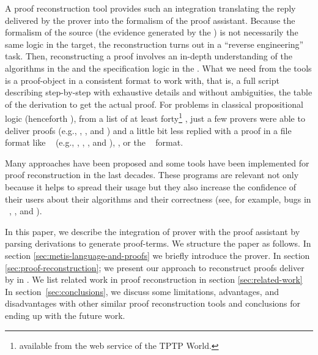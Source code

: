 \documentclass[../main.tex]{subfiles}
\begin{document}
A proof reconstruction tool provides such an integration translating
the reply delivered by the prover into the formalism of the proof
assistant. Because the formalism of the source (the evidence
generated by the \ATP) is not necessarily the same logic in the
target, the reconstruction turns out in a ``reverse engineering''
task. Then, reconstructing a proof involves an in-depth
understanding of the algorithms in the \ATP and the specification
logic in the \ITP. What we need from the \ATP tools is a
proof-object in a consistent format to work with, that is, a full
script describing step-by-step with exhaustive details and without
ambiguities, the table of the derivation to get the actual proof.
For problems in classical propositional logic (henceforth \CPL),
from a list of at least forty\footnote{\ATPs available from the web
service  of the TPTP World.} \ATPs, just a few
provers were able to deliver proofs (e.g., 
\cite{Barrett2011}, , and 
\cite{hillenbrand1997}) and a little bit less replied with a proof
in a file format like \TSTP~\cite{sutcliffe2004tstp} (e.g.,
, \Metis, , and ), 
\cite{Stump2008}, or the ~\cite{Bohme2011} format.

Many approaches have been proposed and some tools have been
implemented for proof reconstruction in the last decades. These
programs are relevant not only because it helps to spread their
usage but they also increase the confidence of their users about
their algorithms and their correctness (see, for example, bugs in
\ATPs~\cite{Keller2013}, \cite{Bohme2011}, \cite{Fleury2014} and
\cite{Kanso2012}). %

In this paper, we describe the integration of \Metis prover with the
proof assistant \Agda by parsing \TSTP derivations to generate \Agda
proof-terms. We structure the paper as follows. In section
\ref{sec:metis-language-and-proofs} we briefly introduce the \Metis
prover. In section \ref{sec:proof-reconstruction}; we present our
approach to reconstruct proofs deliver by \Metis in \Agda. We list
related work in proof reconstruction in section
\ref{sec:related-work} In section~\ref{sec:conclusions}, we discuss
some limitations, advantages, and disadvantages with other similar
proof reconstruction tools and conclusions for ending up with the
future work.
\end{document}

